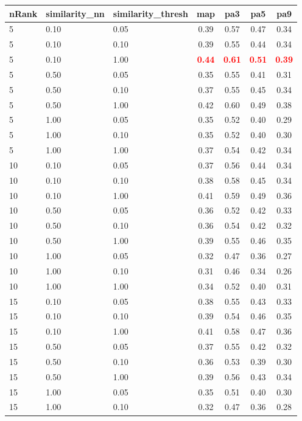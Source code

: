 \begin{tabular}{lllcccc} 
nRank & similarity\_nn & similarity\_thresh & map & pa3 & pa5 & pa9 \\ 
\hline 
 5 & 0.10 & 0.05 & 0.39 & 0.57 & 0.47 & 0.34 \\ 
 5 & 0.10 & 0.10 & 0.39 & 0.55 & 0.44 & 0.34 \\ 
 5 & 0.10 & 1.00 & \textbf{\textcolor{red}{0.44}} & \textbf{\textcolor{red}{0.61}} & \textbf{\textcolor{red}{0.51}} & \textbf{\textcolor{red}{0.39}} \\ 
 5 & 0.50 & 0.05 & 0.35 & 0.55 & 0.41 & 0.31 \\ 
 5 & 0.50 & 0.10 & 0.37 & 0.55 & 0.45 & 0.34 \\ 
 5 & 0.50 & 1.00 & 0.42 & 0.60 & 0.49 & 0.38 \\ 
 5 & 1.00 & 0.05 & 0.35 & 0.52 & 0.40 & 0.29 \\ 
 5 & 1.00 & 0.10 & 0.35 & 0.52 & 0.40 & 0.30 \\ 
 5 & 1.00 & 1.00 & 0.37 & 0.54 & 0.42 & 0.34 \\ 
10 & 0.10 & 0.05 & 0.37 & 0.56 & 0.44 & 0.34 \\ 
10 & 0.10 & 0.10 & 0.38 & 0.58 & 0.45 & 0.34 \\ 
10 & 0.10 & 1.00 & 0.41 & 0.59 & 0.49 & 0.36 \\ 
10 & 0.50 & 0.05 & 0.36 & 0.52 & 0.42 & 0.33 \\ 
10 & 0.50 & 0.10 & 0.36 & 0.54 & 0.42 & 0.32 \\ 
10 & 0.50 & 1.00 & 0.39 & 0.55 & 0.46 & 0.35 \\ 
10 & 1.00 & 0.05 & 0.32 & 0.47 & 0.36 & 0.27 \\ 
10 & 1.00 & 0.10 & 0.31 & 0.46 & 0.34 & 0.26 \\ 
10 & 1.00 & 1.00 & 0.34 & 0.52 & 0.40 & 0.31 \\ 
15 & 0.10 & 0.05 & 0.38 & 0.55 & 0.43 & 0.33 \\ 
15 & 0.10 & 0.10 & 0.39 & 0.54 & 0.46 & 0.35 \\ 
15 & 0.10 & 1.00 & 0.41 & 0.58 & 0.47 & 0.36 \\ 
15 & 0.50 & 0.05 & 0.37 & 0.55 & 0.42 & 0.32 \\ 
15 & 0.50 & 0.10 & 0.36 & 0.53 & 0.39 & 0.30 \\ 
15 & 0.50 & 1.00 & 0.39 & 0.56 & 0.43 & 0.34 \\ 
15 & 1.00 & 0.05 & 0.35 & 0.51 & 0.40 & 0.30 \\ 
15 & 1.00 & 0.10 & 0.32 & 0.47 & 0.36 & 0.28 \\ 

\end{tabular}
